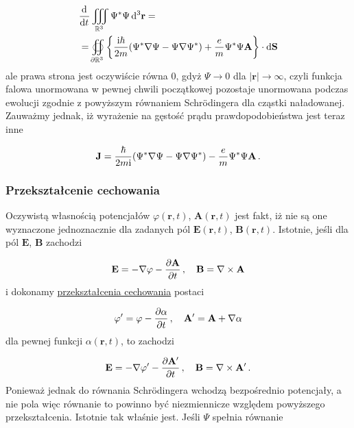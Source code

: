 \documentclass{myclass}
\begin{document}
\begin{equation*}
\begin{split}
    &\dv[]{}{t}\iiint_{\mathbb{R}^3}\Psi^*\Psi\dd{^3\mathbf{r}}=\\
    &=\oiint_{\partial\mathbb{R}^3}\left\{\frac{\mathrm{i}\hbar}{2m}(\Psi^*\nabla\Psi-\Psi\nabla\Psi^*)+\frac{e}{m}\Psi^*\Psi\mathbf{A}\right\}\cdot\dd{\mathbf{S}}
\end{split}
\end{equation*}
ale prawa strona jest oczywiście równa 0, gdyż \(\Psi\to0\) dla \(|\mathbf{r}|\to\infty\), czyli
funkcja falowa unormowana w pewnej chwili początkowej pozostaje unormowana podczas ewolucji zgodnie
z powyższym równaniem Schr{\"o}dingera dla cząstki naładowanej. Zauważmy jednak, iż wyrażenie na
gęstość prądu prawdopodobieństwa jest teraz inne

\begin{equation*}
    \mathbf{J}=\frac{\hbar}{2m\mathrm{i}}(\Psi^*\nabla\Psi-\Psi\nabla\Psi^*)-\frac{e}{m}\Psi^*\Psi\mathbf{A}\,.
\end{equation*}

\subsubsection{Przekształcenie cechowania}

Oczywistą własnością potencjałów \(\varphi(\mathbf{r},t)\), \(\mathbf{A}(\mathbf{r},t)\) jest fakt,
iż nie są one wyznaczone jednoznacznie dla zadanych pól \(\mathbf{E}(\mathbf{r},t)\),
\(\mathbf{B}(\mathbf{r},t)\). Istotnie, jeśli dla pól \(\mathbf{E}\), \(\mathbf{B}\) zachodzi

\begin{equation*}
    \mathbf{E}=-\nabla\varphi-\pdv{\mathbf{A}}{t}\,,\quad \mathbf{B}=\nabla\times\mathbf{A}
\end{equation*}
i dokonamy \underline{przekształcenia cechowania} postaci

\begin{equation*}
    \varphi'=\varphi-\pdv{\alpha}{t}\,,\quad\mathbf{A}'=\mathbf{A}+\nabla\alpha
\end{equation*}
dla pewnej funkcji \(\alpha(\mathbf{r},t)\), to zachodzi

\begin{equation*}
    \mathbf{E}=-\nabla\varphi'-\pdv{\mathbf{A}'}{t}\,,\quad \mathbf{B}=\nabla\times\mathbf{A}'\,.
\end{equation*}
Ponieważ jednak do równania Schr{\"o}dingera wchodzą bezpośrednio potencjały, a nie pola więc
równanie to powinno być niezmiennicze względem powyższego przekształcenia. Istotnie tak właśnie
jest. Jeśli \(\Psi\) spełnia równanie
\end{document}
